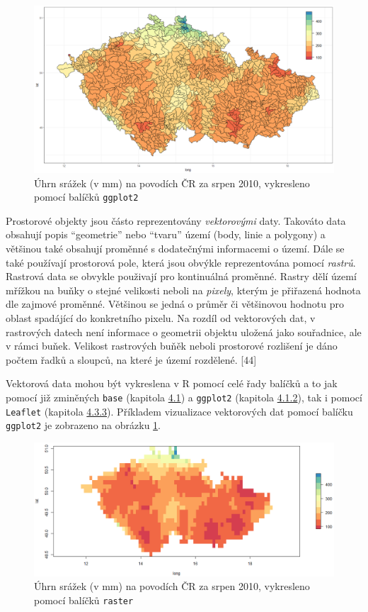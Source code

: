 \documentclass[12pt,]{article}
\begin{document}
\begin{figure}[H]
  \centering
      \includegraphics[width=\textwidth]{fig/ggplot_map2}
      \caption{Úhrn srážek (v mm) na povodích ČR za srpen 2010, vykresleno pomocí balíčků \texttt{ggplot2}}
      \label{fig02}
\end{figure}

\qquad Prostorové objekty jsou částo reprezentovány \emph{vektorovými}
daty. Takováto data obsahují popis \enquote{geometrie} nebo
\enquote{tvaru} území (body, linie a polygony) a většinou také obsahují
proměnné s dodatečnými informacemi o území. Dále se také používají
prostorová pole, která jsou obvýkle reprezentována pomocí \emph{rastrů}.
Rastrová data se obvykle použivají pro kontinuálná proměnné. Rastry dělí
území mřížkou na buňky o stejné velikosti neboli na \emph{pixely},
kterým je přiřazená hodnota dle zajmové proměnné. Většinou se jedná o
průměr či většinovou hodnotu pro oblast spadájící do konkretního pixelu.
Na rozdíl od vektorových dat, v rastrových datech není informace o
geometrii objektu uložená jako souřadnice, ale v rámci buňek. Velikost
rastrových buňěk neboli prostorové rozlišení je dáno počtem řadků a
sloupců, na které je území rozdělené. {[}44{]}

\qquad Vektorová data mohou být vykreslena v R pomocí celé řady balíčků
a to jak pomocí již zminěných \texttt{base} (kapitola
\protect\hyperlink{base}{4.1}) a \texttt{ggplot2} (kapitola
\protect\hyperlink{gg}{4.1.2}), tak i pomocí \texttt{Leaflet} (kapitola
\protect\hyperlink{leaflet}{4.3.3}). Příkladem vizualizace vektorových
dat pomocí balíčku \texttt{ggplot2} je zobrazeno na obrázku \ref{fig02}.

\begin{figure}[H]
  \centering
      \includegraphics[width=\textwidth]{fig/raster_map2}
      \caption{Úhrn srážek (v mm) na povodích ČR za srpen 2010, vykresleno pomocí balíčků \texttt{raster}} 
      \label{fig03}
\end{figure}
\end{document}
